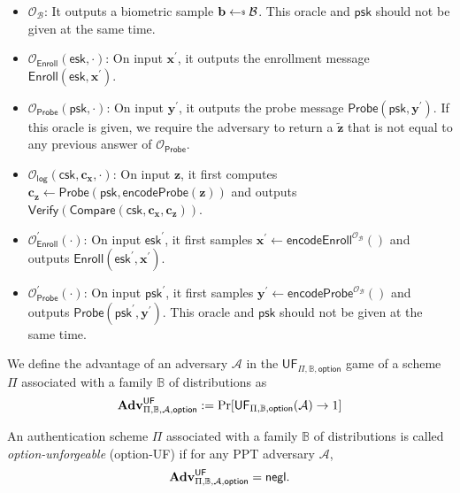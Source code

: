 \begin{itemize}

	\item $\mathcal{O}_{\mathcal{B}}$: It outputs a biometric sample $\mathbf{b} \getsdollar \mathcal{B}$. This oracle and $\textsf{psk}$ should not be given at the same time.
	
	\item $\mathcal{O}_\textsf{Enroll}(\textsf{esk}, \cdot)$: On input $\mathbf{x}^\prime$, it outputs the enrollment message $\textsf{Enroll}(\textsf{esk}, \mathbf{x}^\prime)$.

	\item $\mathcal{O}_\textsf{Probe}(\textsf{psk}, \cdot)$: On input $\mathbf{y}^\prime$, it outputs the probe message $\textsf{Probe}(\textsf{psk}, \mathbf{y}^\prime)$. If this oracle is given, we require the adversary to return a $\mathbf{\tilde{z}}$ that is not equal to any previous answer of $\mathcal{O}_\textsf{Probe}$.
	
	\item $\mathcal{O}_\textsf{log}(\textsf{csk}, \mathbf{c_x}, \cdot)$: On input $\mathbf{z}$, it first computes $\mathbf{c_z} \gets \textsf{Probe}(\textsf{psk}, \textsf{encodeProbe}(\mathbf{z}))$ and outputs $\textsf{Verify}(\textsf{Compare}(\textsf{csk}, \mathbf{c_x}, \mathbf{c_z} ) )$.
	
	\item $\mathcal{O}_\textsf{Enroll}^\prime (\cdot)$: On input $\textsf{esk}^\prime$, it first samples $\mathbf{x}^\prime \gets \textsf{encodeEnroll}^{\mathcal{O}_{\mathcal{B}}}()$ and outputs $\textsf{Enroll}(\textsf{esk}^\prime, \mathbf{x}^\prime)$.

	\item $\mathcal{O}_\textsf{Probe}^\prime (\cdot)$: On input $\textsf{psk}^\prime$, it first samples $\mathbf{y}^\prime \gets \textsf{encodeProbe}^{\mathcal{O}_{\mathcal{B}}}()$ and outputs $\textsf{Probe}(\textsf{psk}^\prime, \mathbf{y}^\prime)$. This oracle and $\textsf{psk}$ should not be given at the same time. 
	
\end{itemize}

We define the advantage of an adversary $\mathcal{A}$ in the $\textsf{UF}_{\Pi, \mathbb{B}, \textsf{option}}$ game of a scheme $\Pi$ associated with a family $\mathbb{B}$ of distributions as
\[
	\mathbf{Adv}^{\textsf{UF}}_{\Pi, \mathbb{B}, \mathcal{A}, \textsf{option}} := \Pr[\textsf{UF}_{\Pi, \mathbb{B}, \textsf{option}}(\mathcal{A}) \to 1]
\]

An authentication scheme $\Pi$ associated with a family $\mathbb{B}$ of distributions is called \emph{\textsf{option}-unforgeable} (\textsf{option}-UF) if for any PPT adversary $\mathcal{A}$,
\[
	\mathbf{Adv}^{\textsf{UF}}_{\Pi, \mathbb{B}, \mathcal{A}, \textsf{option}} = \mathsf{negl}.
\]


